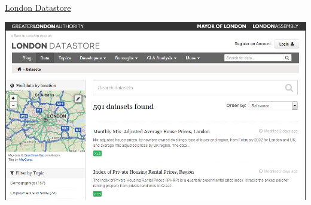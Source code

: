 \documentclass[ignorenonframetext,]{beamer}
\begin{document}
\begin{frame}{\href{http://data.london.gov.uk/dataset}{London
Datastore}}
\protect\hypertarget{london-datastore}{}

\includegraphics{figure/LondonData.PNG}

\end{frame}
\end{document}
